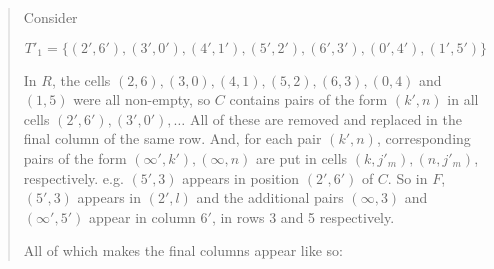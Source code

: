 \documentclass[
  11pt,
  a4paper]{book}
\begin{document}
\begin{quote}
Consider

\begin{equation}
T'_1 = \{(2',6'),(3',0'),(4',1'),(5',2'),(6',3'),(0',4'),(1',5')\}
\end{equation}

In $R$, the cells
$(2, 6), (3, 0), (4, 1), (5, 2), (6, 3), (0, 4)$ and
$(1, 5)$ were all non-empty, so $C$ contains pairs of the
form $(k', n)$ in all cells $(2', 6'), (3', 0'), \ldots$
All of these are removed and replaced in the final column of
the same row. And, for each pair $(k', n)$, corresponding
pairs of the form $(\infty ', k'), (\infty,n)$ are put in
cells $(k, j'_m), (n, j'_m)$, respectively.  e.g.  $(5',3)$
appears in position $(2', 6')$ of $C$. So in $F$, $(5', 3)$
appears in $(2', l)$ and the additional pairs $(\infty, 3)$
and $(\infty ', 5')$ appear in column $6'$, in rows 3 and 5
respectively.

All of which makes the final columns appear like so:


\end{quote}
\end{document}
